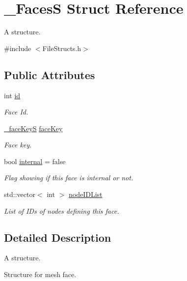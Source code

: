 \hypertarget{struct___faces_s}{}\section{\+\_\+\+FacesS Struct Reference}
\label{struct___faces_s}


A structure.  




{\ttfamily \#include $<$File\+Structs.\+h$>$}

\subsection*{Public Attributes}
\begin{DoxyCompactItemize}
\item 
int \hyperlink{struct___faces_s_a7365ff5c5951b2a61ef5e4411b0d521a}{id}
\begin{DoxyCompactList}\small\item\em Face Id. \end{DoxyCompactList}\item 
\hyperlink{struct__face_key_s}{\+\_\+face\+KeyS} \hyperlink{struct___faces_s_a0b72e5930902a49f376d035d654ecef8}{face\+Key}
\begin{DoxyCompactList}\small\item\em Face key. \end{DoxyCompactList}\item 
bool \hyperlink{struct___faces_s_a5ce239e336aea528dad6008a6f2909f0}{internal} = false
\begin{DoxyCompactList}\small\item\em Flag showing if this face is internal or not. \end{DoxyCompactList}\item 
std\+::vector$<$ int $>$ \hyperlink{struct___faces_s_a1af35bd658b7be0f98e09deb5f8b3ead}{node\+I\+D\+List}
\begin{DoxyCompactList}\small\item\em List of I\+Ds of nodes defining this face. \end{DoxyCompactList}\end{DoxyCompactItemize}


\subsection{Detailed Description}
A structure. 

Structure for mesh face. 


